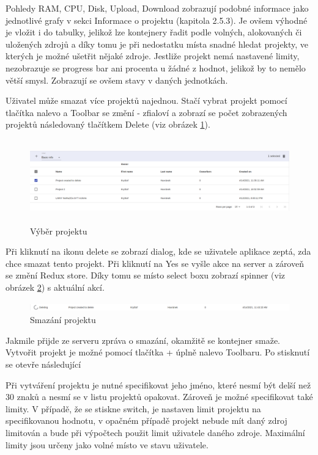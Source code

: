 \documentclass[a4paper,oneside,12pt]{report}
\begin{document}
Pohledy RAM, CPU, Disk, Upload, Download zobrazují podobné informace jako jednotlivé grafy v sekci Informace o projektu (kapitola 2.5.3).
Je ovšem výhodné je vložit i do tabulky, jelikož lze kontejnery řadit podle volných, alokovaných či uložených zdrojů a díky tomu je při nedostatku místa snadné hledat projekty, ve kterých je možné ušetřit nějaké zdroje.
Jestliže projekt nemá nastavené limity, nezobrazuje se progress bar ani procenta u žádné z hodnot, jelikož by to nemělo větší smysl. Zobrazují se ovšem stavy v daných jednotkách.

Uživatel může smazat více projektů najednou.
Stačí vybrat projekt pomocí tlačítka nalevo a Toolbar se změní - zfialoví a zobrazí se počet zobrazených projektů následovaný tlačítkem Delete (viz obrázek \ref{fig:projectSelect}).

\begin{figure}[h]
	\centering
	\includegraphics[height=3.6cm]{../img/project.png}
	\caption[Výběr projektu, vlastní tvorba]{Výběr projektu}
	\label{fig:projectSelect}
\end{figure}

Při kliknutí na ikonu delete se zobrazí dialog, kde se uživatele aplikace zeptá, zda chce smazat tento projekt.
Při kliknutí na Yes se vyšle akce na server a zároveň se změní Redux store. Díky tomu se místo select boxu zobrazí spinner (viz obrázek \ref{fig:detelePro}) s aktuální akcí.

\begin{figure}[h]
	\centering
	\includegraphics[height=0.35cm]{../img/deletingPro.png}
	\caption[Smazání projektu, vlastní tvorba]{Smazání projektu}
	\label{fig:detelePro}
\end{figure}

\newpage
Jakmile přijde ze serveru zpráva o smazání, okamžitě se kontejner smaže.
Vytvořit projekt je možné pomocí tlačítka + úplně nalevo Toolbaru. Po stisknutí se otevře následující

Při vytváření projektu je nutné specifikovat jeho jméno, které nesmí být delší než 30 znaků a nesmí se v listu projektů opakovat. Zároveň je možné specifikovat také limity. V případě, že se stiskne switch, je nastaven limit projektu na specifikovanou hodnotu, v opačném případě projekt nebude mít daný zdroj limitován a bude při výpočtech použit limit uživatele daného zdroje. Maximální limity jsou určeny jako volné místo ve stavu uživatele.
\end{document}
